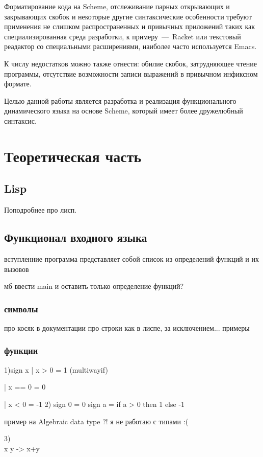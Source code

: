 \documentclass[12pt,a4paper,oneside]{extarticle}
\begin{document}
    Форматирование кода на Scheme, отслеживание парных открывающих и закрывающих скобок и некоторые другие синтаксические особенности требуют применения не слишком распространенных и привычных приложений таких как специализированная среда разработки, к примеру~---~Racket или текстовый реадактор со специальными расширениями, наиболее часто используется Emacs. 

    К числу недостатков можно также отнести: обилие скобок, затрудняющее чтение программы, отсутствие возможности записи выражений в привычном инфиксном формате.
    
    Целью данной работы является разработка и реализация функционального динамического языка на основе Scheme, который имеет более дружелюбный синтаксис.
\clearpage

\section{Теоретическая часть}
    \subsection{Lisp}
        Поподробнее про лисп.
    \subsection{Функционал входного языка}
        вступленние
        программа представляет собой список из определений функций и их вызовов

        мб ввести main и оставить только определение функций?

        \subsubsection{символы}
            про косяк в документации про строки
            как в лиспе, за исключением... 
            примеры
        \subsubsection{функции}
            1)sign x  | x > 0  = 1 (multiwayif)

                | x == 0 = 0

                | x < 0  = -1
            2) sign 0 = 0 
            sign a = if a > 0 then 1 else -1

            пример на Algebraic data type ?! я не работаю с типами :(

            3) \\x y -> x+y 
\end{document}
